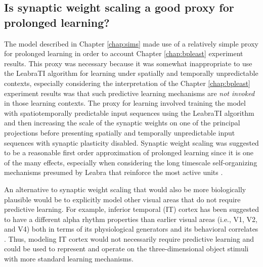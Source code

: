 \documentclass[dwyatte_dissertation.tex]{subfiles}
\begin{document}

\subsection{Is synaptic weight scaling a good proxy for prolonged learning?} 
The model described in Chapter \ref{chap:sims} made use of a relatively simple proxy for prolonged learning in order to account Chapter \ref{chap:bpleast} experiment results. This proxy was necessary because it was somewhat inappropriate to use the LeabraTI algorithm for learning under spatially and temporally unpredictable contexts, especially considering the interpretation of the Chapter \ref{chap:bpleast} experiment results was that such predictive learning mechanisms are \textit{not invoked} in those learning contexts. The proxy for learning involved training the model with spatiotemporally predictable input sequences using the LeabraTI algorithm and then increasing the scale of the synaptic weights on one of the principal projections before presenting spatially and temporally unpredictable input sequences with synaptic plasticity disabled. Synaptic weight scaling was suggested to be a reasonable first order approximation of prolonged learning since it is one of the many effects, especially when considering the long timescale self-organizing mechanisms presumed by Leabra that reinforce the most active units \cite{OReillyMunakata00,OReillyMunakataFrankEtAl12}.

An alternative to synaptic weight scaling that would also be more biologically plausible would be to explicitly model other visual areas that do not require predictive learning. For example, inferior temporal (IT) cortex has been suggested to have a different alpha rhythm properties than earlier visual areas (i.e., V1, V2, and V4) both in terms of its physiological generators and its behavioral correlates \cite{BollimuntaChenSchroederEtAl08}. Thus, modeling IT cortex would not necessarily require predictive learning and could be used to represent and operate on the three-dimensional object stimuli with more standard learning mechanisms. 
\end{document}
